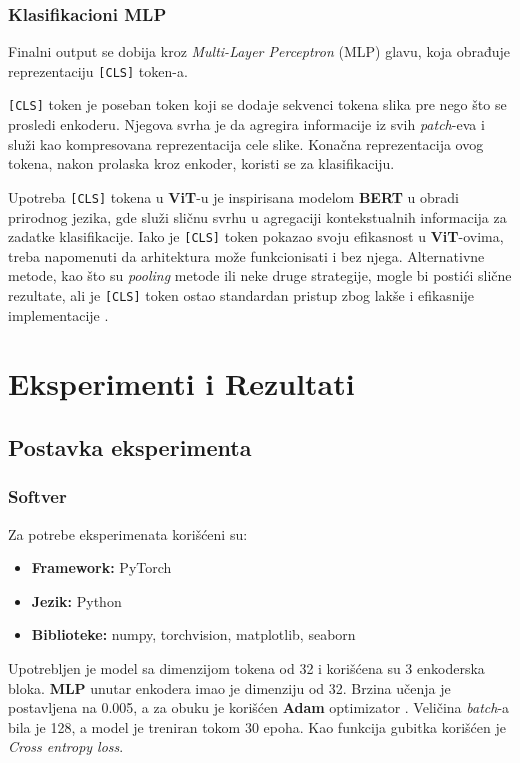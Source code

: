 \documentclass[12pt]{article}
\begin{document}
   \newpage
   \subsubsection{Klasifikacioni MLP}
   Finalni output se dobija kroz \textit{Multi-Layer Perceptron} (MLP) glavu, koja 
   obrađuje reprezentaciju \texttt{[CLS]} token-a.

   \texttt{[CLS]} token je poseban token koji se dodaje sekvenci tokena slika pre 
   nego što se prosledi enkoderu. Njegova svrha je da agregira informacije iz svih 
   \textit{patch}-eva i služi kao kompresovana reprezentacija cele slike. Konačna 
   reprezentacija ovog tokena, nakon prolaska kroz enkoder, koristi se za 
   klasifikaciju.

   Upotreba \texttt{[CLS]} tokena u \textbf{ViT}-u je inspirisana modelom \textbf{BERT} 
   \cite{bert} u obradi prirodnog jezika, gde služi sličnu svrhu u agregaciji kontekstualnih 
   informacija za zadatke klasifikacije. Iako je \texttt{[CLS]} token pokazao svoju efikasnost u 
   \textbf{ViT}-ovima, treba napomenuti da arhitektura može funkcionisati i bez njega. 
   Alternativne metode, kao što su \textit{pooling} metode ili neke druge strategije, mogle 
   bi postići slične rezultate, ali je \texttt{[CLS]} token ostao standardan pristup zbog lakše i efikasnije
   implementacije \cite{vit}.

   \section{Eksperimenti i Rezultati}
   \subsection{Postavka eksperimenta}
   \subsubsection{Softver}
   Za potrebe eksperimenata korišćeni su:
   \begin{itemize}
      \vspace{-0.5cm}
      \setlength\itemsep{0.2em} %
      \item \textbf{Framework:} PyTorch
      \item \textbf{Jezik:} Python
      \item \textbf{Biblioteke:} numpy, torchvision, matplotlib, seaborn
   \end{itemize}
   Upotrebljen je model sa dimenzijom tokena od 32 i 
   korišćena su 3 enkoderska bloka. \textbf{MLP} unutar enkodera imao je dimenziju 
   od 32. Brzina učenja je postavljena na 0.005, a za obuku je korišćen \textbf{Adam} 
   optimizator \cite{adam}. Veličina \textit{batch}-a bila je 128, a model je 
   treniran tokom 30 epoha. Kao funkcija gubitka korišćen je \textit{Cross entropy loss}.
\end{document}

